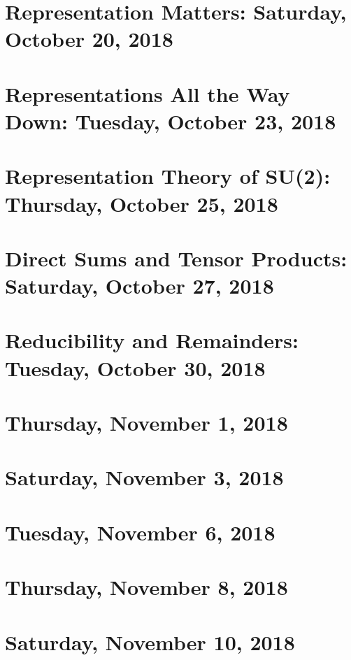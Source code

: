 \documentclass[reqno]{amsart}
\begin{document}
\section{Representation Matters: Saturday, October 20, 2018}
    
\section{Representations All the Way Down: Tuesday, October 23, 2018}
    
\section{Representation Theory of SU(2): Thursday, October 25, 2018}
    
\section{Direct Sums and Tensor Products: Saturday, October 27, 2018}
    
\section{Reducibility and Remainders: Tuesday, October 30, 2018}
    
\section{Thursday, November 1, 2018}
    
\section{Saturday, November 3, 2018}
    
\section{Tuesday, November 6, 2018}
    
\section{Thursday, November 8, 2018}
    
\section{Saturday, November 10, 2018}
    
\end{document}
